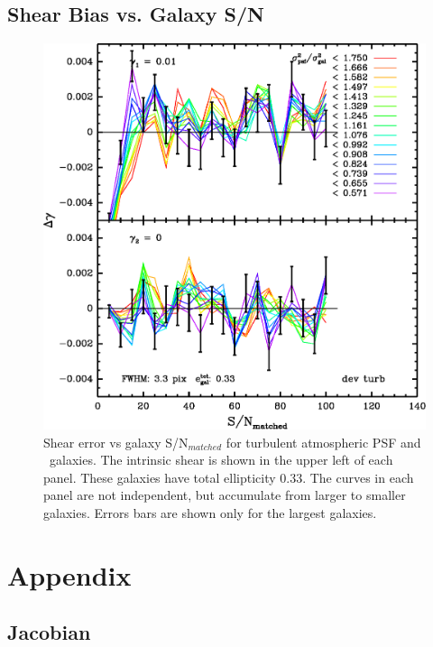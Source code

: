 \documentclass[12pt,preprint]{aastex}
\begin{document}
\subsection{Shear Bias vs. Galaxy S/N}

\begin{figure}[t] \centering \centering
\includegraphics[scale=0.7]{figures/gmix-fit-dt02r02-yr-0.005-0.005-diff-cum.eps}

 \caption{Shear error vs galaxy S/N$_{matched}$ for turbulent atmospheric PSF
 and \devauc\ galaxies. The intrinsic shear is shown in the upper left of
 each panel.  These galaxies have total ellipticity 0.33.  The curves in each
 panel are not independent, but accumulate from larger to smaller galaxies.
 Errors bars are shown only for the largest galaxies.
 \label{fig:dt02r02}}

\end{figure}







\appendix 

\section{Appendix}
\subsection{Jacobian}
\end{document}

